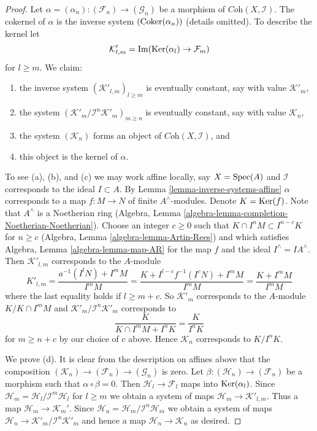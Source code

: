 \begin{proof}
Let $\alpha =(\alpha_n) : (\mathcal{F}_n) \to (\mathcal{G}_n)$ be a morphism of
$\textit{Coh}(X, \mathcal{I})$. The cokernel of $\alpha$ is the inverse system
$(\mathop{\mathrm{Coker}}(\alpha_n))$ (details omitted). To describe the kernel let
$$
\mathcal{K}'_{l, m} = \mathop{\mathrm{Im}}(\mathop{\mathrm{Ker}}(\alpha_l) \to \mathcal{F}_m)
$$
for $l \geq m$.
We claim:
\begin{enumerate}
\item[(a)] the inverse system $(\mathcal{K}'_{l, m})_{l \geq m}$ is
eventually constant, say with value $\mathcal{K}'_m$,
\item[(b)] the system $(\mathcal{K}'_m/\mathcal{I}^n\mathcal{K}'_m)_{m \geq n}$
is eventually constant, say with value $\mathcal{K}_n$,
\item[(c)] the system $(\mathcal{K}_n)$ forms an object of
$\textit{Coh}(X, \mathcal{I})$, and
\item[(d)] this object is the kernel of $\alpha$.
\end{enumerate}
To see (a), (b), and (c) we may work affine locally, say $X = \mathop{\mathrm{Spec}}(A)$
and $\mathcal{I}$ corresponds to the ideal $I \subset A$. By
Lemma \ref{lemma-inverse-systems-affine}
$\alpha$ corresponds to a map $f : M \to N$ of finite $A^\wedge$-modules.
Denote $K = \mathop{\mathrm{Ker}}(f)$. Note that $A^\wedge$ is a Noetherian
ring (Algebra, Lemma \ref{algebra-lemma-completion-Noetherian-Noetherian}).
Choose an integer $c \geq 0$ such that
$K \cap I^n M \subset I^{n - c}K$ for $n \geq c$
(Algebra, Lemma \ref{algebra-lemma-Artin-Rees})
and which satisfies Algebra, Lemma \ref{algebra-lemma-map-AR}
for the map $f$ and the ideal $I^\wedge = IA^\wedge$. Then
$\mathcal{K}'_{l, m}$ corresponds to the $A$-module
$$
K'_{l, m} = \frac{a^{-1}(I^lN) + I^mM}{I^mM} =
\frac{K + I^{l - c}f^{-1}(I^cN) + I^mM}{I^mM} =
\frac{K + I^mM}{I^mM}
$$
where the last equality holds if $l \geq m + c$. So $\mathcal{K}'_m$
corresponds to the $A$-module $K/K \cap I^mM$ and
$\mathcal{K}'_m/\mathcal{I}^n\mathcal{K}'_m$ corresponds to
$$
\frac{K}{K \cap I^mM + I^nK} = \frac{K}{I^nK}
$$
for $m \geq n + c$ by our choice of $c$ above. Hence $\mathcal{K}_n$
corresponds to $K/I^nK$.

\medskip\noindent
We prove (d). It is clear from the description on affines above that
the composition $(\mathcal{K}_n) \to (\mathcal{F}_n) \to (\mathcal{G}_n)$
is zero. Let $\beta : (\mathcal{H}_n) \to (\mathcal{F}_n)$
be a morphism such that $\alpha \circ \beta = 0$. Then
$\mathcal{H}_l \to \mathcal{F}_l$ maps into $\mathop{\mathrm{Ker}}(\alpha_l)$.
Since $\mathcal{H}_m = \mathcal{H}_l/\mathcal{I}^m\mathcal{H}_l$
for $l \geq m$ we obtain a system of maps
$\mathcal{H}_m \to \mathcal{K}'_{l, m}$. Thus a map
$\mathcal{H}_m \to \mathcal{K}_m'$. Since
$\mathcal{H}_n = \mathcal{H}_m/\mathcal{I}^n\mathcal{H}_m$ we obtain
a system of maps $\mathcal{H}_n \to \mathcal{K}'_m/\mathcal{I}^n\mathcal{K}'_m$
and hence a map $\mathcal{H}_n \to \mathcal{K}_n$ as desired.


\end{proof}
